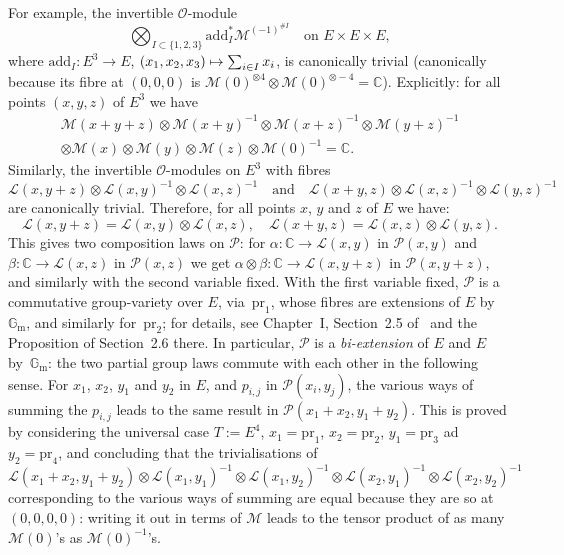 \documentclass[11pt]{article}
\providecommand{\C}{}
\providecommand{\G}{}
\let\mathcal\mathscr
\def\mto{\mathchoice{\longmapsto}{\mapsto}{\mapsto}{\mapsto}}
\theoremstyle{plain}
\theoremstyle{definition}
\numberwithin{equation}{subsection}
\renewcommand{\C}{\mathbb C}
\renewcommand{\G}{\mathbb G}
\newcommand{\calL}{\mathcal{L}}
\newcommand{\calM}{\mathcal{M}}
\newcommand{\calO}{\mathcal{O}}
\newcommand{\calP}{\mathcal{P}}
\newcommand{\add}{\mathrm{add}}
\newcommand{\Gm}{\G_{\mathrm{m}}}
\newcommand{\pr}{\mathrm{pr}}
\begin{document}
For example, the invertible $\calO$-module
\[
\bigotimes_{I\subset\{1,2,3\}}\add_I^*\calM^{(-1)^{\# I}} \quad \text{on $E\times E\times E$},
\]
where $\add_I\colon E^3\to E$, $(x_1,x_2,x_3)\mto\sum_{i\in I}x_i$, is canonically
trivial (canonically because its fibre at $(0,0,0)$ is
$\calM(0)^{\otimes 4}\otimes\calM(0)^{\otimes-4}=\C$).
Explicitly: for all points $(x,y,z)$ of $E^3$ we have
\begin{multline*}
\calM(x+y+z)\otimes\calM(x+y)^{-1}\otimes\calM(x+z)^{-1}\otimes\calM(y+z)^{-1} \\
\otimes\calM(x)\otimes\calM(y)\otimes\calM(z) \otimes\calM(0)^{-1}=\C.
\end{multline*}
Similarly, the invertible $\calO$-modules on $E^3$ with fibres
\[
\calL(x,y+z)\otimes\calL(x,y)^{-1}\otimes\calL(x,z)^{-1}
\quad\text{and}\quad
\calL(x+y,z)\otimes\calL(x,z)^{-1}\otimes\calL(y,z)^{-1}
\]
are canonically trivial. Therefore, for all points $x$, $y$ and $z$ of
$E$ we have:
\begin{equation}\label{eqn:L=biadditive}
\calL(x,y+z) = \calL(x,y)\otimes\calL(x,z),
\quad \calL(x+y,z)=\calL(x,z)\otimes\calL(y,z).
\end{equation}
This gives two composition laws on $\calP$: for
$\alpha\colon\C\to\calL(x,y)$ in $\calP(x,y)$ and
$\beta\colon\C\to\calL(x,z)$ in $\calP(x,z)$ we get
$\alpha\otimes\beta\colon\C\to\calL(x,y+z)$ in $\calP(x,y+z)$, and
similarly with the second variable fixed. With the first variable fixed,
$\calP$ is a commutative group-variety over $E$, via~$\pr_1$, whose
fibres are extensions of $E$ by~$\Gm$, and similarly for~$\pr_2$; for
details, see Chapter~I, Section~2.5 of~\cite{Moret-Bailly} and the Proposition
of Section~2.6 there. In particular, $\calP$ is a \emph{bi-extension} of $E$
and $E$ by~$\Gm$: the two partial group laws commute with each other
in the following sense. For $x_1$, $x_2$, $y_1$ and $y_2$ in $E$, and
$p_{i,j}$ in $\calP(x_i,y_j)$, the various ways of summing the
$p_{i,j}$ leads to the same result in $\calP(x_1+x_2,y_1+y_2)$. This
is proved by considering the universal case $T:=E^4$, $x_1=\pr_1$,
$x_2=\pr_2$, $y_1=\pr_3$ ad $y_2=\pr_4$, and concluding that the
trivialisations of
\[
\calL(x_1+x_2,y_1+y_2)\otimes\calL(x_1,y_1)^{-1}\otimes\calL(x_1,y_2)^{-1}
\otimes\calL(x_2,y_1)^{-1}\otimes\calL(x_2,y_2)^{-1}
\]
corresponding to the various ways of summing are equal because they
are so at $(0,0,0,0)$: writing it out in terms of $\calM$ leads to the
tensor product of as many $\calM(0)$'s as $\calM(0)^{-1}$'s.
\end{document}
